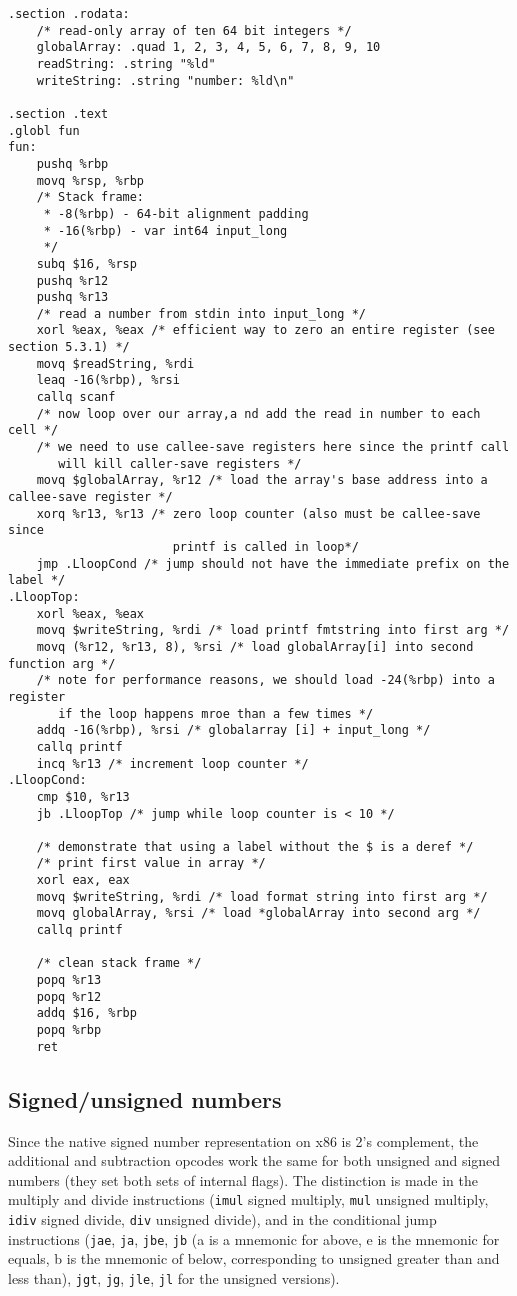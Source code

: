 \documentclass[11pt]{article}
\begin{document}
\begin{lstlisting}
.section .rodata:
    /* read-only array of ten 64 bit integers */
    globalArray: .quad 1, 2, 3, 4, 5, 6, 7, 8, 9, 10
    readString: .string "%ld"
    writeString: .string "number: %ld\n"

.section .text
.globl fun
fun:
    pushq %rbp
    movq %rsp, %rbp
    /* Stack frame:
     * -8(%rbp) - 64-bit alignment padding
     * -16(%rbp) - var int64 input_long
     */
    subq $16, %rsp
    pushq %r12
    pushq %r13
    /* read a number from stdin into input_long */
    xorl %eax, %eax /* efficient way to zero an entire register (see section 5.3.1) */
    movq $readString, %rdi
    leaq -16(%rbp), %rsi
    callq scanf
    /* now loop over our array,a nd add the read in number to each cell */
    /* we need to use callee-save registers here since the printf call
       will kill caller-save registers */
    movq $globalArray, %r12 /* load the array's base address into a callee-save register */
    xorq %r13, %r13 /* zero loop counter (also must be callee-save since
                       printf is called in loop*/
    jmp .LloopCond /* jump should not have the immediate prefix on the label */
.LloopTop:
    xorl %eax, %eax
    movq $writeString, %rdi /* load printf fmtstring into first arg */
    movq (%r12, %r13, 8), %rsi /* load globalArray[i] into second function arg */
    /* note for performance reasons, we should load -24(%rbp) into a register
       if the loop happens mroe than a few times */
    addq -16(%rbp), %rsi /* globalarray [i] + input_long */
    callq printf
    incq %r13 /* increment loop counter */
.LloopCond:
    cmp $10, %r13
    jb .LloopTop /* jump while loop counter is < 10 */

    /* demonstrate that using a label without the $ is a deref */
    /* print first value in array */
    xorl eax, eax
    movq $writeString, %rdi /* load format string into first arg */
    movq globalArray, %rsi /* load *globalArray into second arg */
    callq printf

    /* clean stack frame */
    popq %r13
    popq %r12
    addq $16, %rbp
    popq %rbp
    ret
\end{lstlisting}

\subsection{Signed/unsigned numbers}

Since the native signed number representation on x86 is 2's complement, the additional and
subtraction opcodes work the same for both unsigned and signed numbers (they set both sets
of internal flags). The distinction is made in the multiply and divide instructions
(\texttt{imul} signed multiply, \texttt{mul} unsigned multiply, \texttt{idiv} signed
divide, \texttt{div} unsigned divide), and in the conditional jump instructions
(\texttt{jae}, \texttt{ja}, \texttt{jbe}, \texttt{jb} (a is a mnemonic for above, e is the
mnemonic for equals, b is the mnemonic of below, corresponding to unsigned greater than
and less than), \texttt{jgt}, \texttt{jg}, \texttt{jle}, \texttt{jl} for the unsigned
versions).
\end{document}
